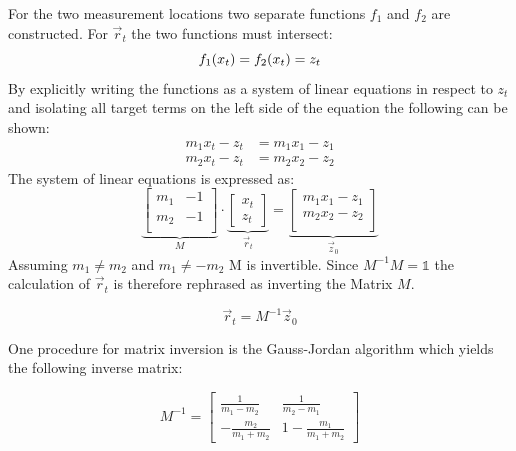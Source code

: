 \documentclass[a4paper,10pt]{article}
\begin{document}
\begin{multicols}{2}
    For the two measurement locations two separate functions $f_1$ and $f_2$ are constructed. For $\vec r_t$ the two functions must intersect:
    \begin{equation}
        f_1(x_t) = f_2(x_t) = z_t\\
    \end{equation}
    By explicitly writing the functions as a system of linear equations in respect to $z_t$ and isolating all target terms on the left side of the equation the following can be shown:
    \begin{align}
        m_1 x_t - z_t &= m_1 x_1 - z_1\\
        m_2 x_t - z_t &= m_2 x_2 - z_2
    \end{align}
    The system of linear equations is expressed as:
    \begin{equation}
        \underbrace{
        \begin{bmatrix}
            m_1 & -1\\
            m_2 & -1\\
        \end{bmatrix}}_M
        \cdot
        \underbrace{
        \begin{bmatrix}
            x_t \\ z_t
        \end{bmatrix}}_{\vec r_t}
         =
         \underbrace{
         \begin{bmatrix}
            m_1 x_1 - z_1\\
            m_2 x_2 - z_2\\  
         \end{bmatrix}}_{\vec z_0}
    \end{equation}
    Assuming $m_1 \ne m_2$ and $m_1 \ne -m_2$ M is invertible.
    Since $M^{-1}M = \mathbb{1}$ the calculation of $\vec{r}_t$ is therefore rephrased as inverting the Matrix $M$.

    \begin{equation}
        \vec r_t = M^{-1}{\vec z_0}
    \end{equation}

    One procedure for matrix inversion is the Gauss-Jordan algorithm \cite[436]{alma991016822109706467} which yields the following inverse matrix:

    \begin{equation}
        M^{-1} = \begin{bmatrix}
            \frac{1}{m_1 - m_2} & \frac{1}{m_2 - m_1}\\
            -\frac{m_2}{m_1+m_2} & 1-\frac{m_1}{m_1+m_2}
        \end{bmatrix}
    \end{equation}


\end{multicols}
\end{document}
